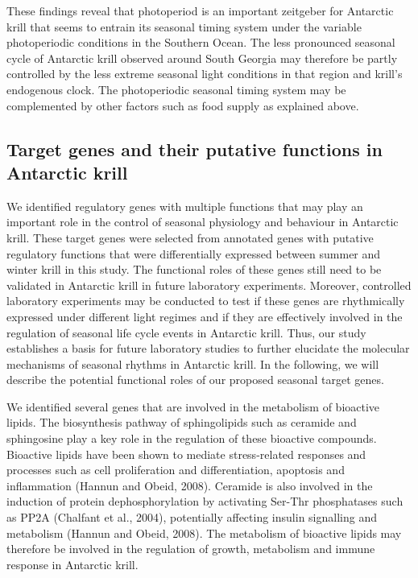 These findings reveal that photoperiod is an important zeitgeber for Antarctic krill that seems to entrain its seasonal timing system under the variable photoperiodic conditions in the Southern Ocean. The less pronounced seasonal cycle of Antarctic krill observed around South Georgia may therefore be partly controlled by the less extreme seasonal light conditions in that region and krill's endogenous clock. The photoperiodic seasonal timing system may be complemented by other factors such as food supply as explained above.

\subsection*{Target genes and their putative functions in Antarctic krill}

We identified regulatory genes with multiple functions that may play an important role in the control of seasonal physiology and behaviour in Antarctic krill. These target genes were selected from annotated genes with putative regulatory functions that were differentially expressed between summer and winter krill in this study. The functional roles of these genes still need to be validated in Antarctic krill in future laboratory experiments. Moreover, controlled laboratory experiments may be conducted to test if these genes are rhythmically expressed under different light regimes and if they are effectively involved in the regulation of seasonal life cycle events in Antarctic krill. Thus, our study establishes a basis for future laboratory studies to further elucidate the molecular mechanisms of seasonal rhythms in Antarctic krill. In the following, we will describe the potential functional roles of our proposed seasonal target genes. 

We identified several genes that are involved in the metabolism of bioactive lipids. The biosynthesis pathway of sphingolipids such as ceramide and sphingosine play a key role in the regulation of these bioactive compounds. Bioactive lipids have been shown to mediate stress-related responses and processes such as cell proliferation and differentiation, apoptosis and inflammation (Hannun and Obeid, 2008). Ceramide is also involved in the induction of protein dephosphorylation by activating Ser-Thr phosphatases such as PP2A (Chalfant et al., 2004), potentially affecting insulin signalling and metabolism (Hannun and Obeid, 2008). The metabolism of bioactive lipids may therefore be involved in the regulation of growth, metabolism and immune response in Antarctic krill.

